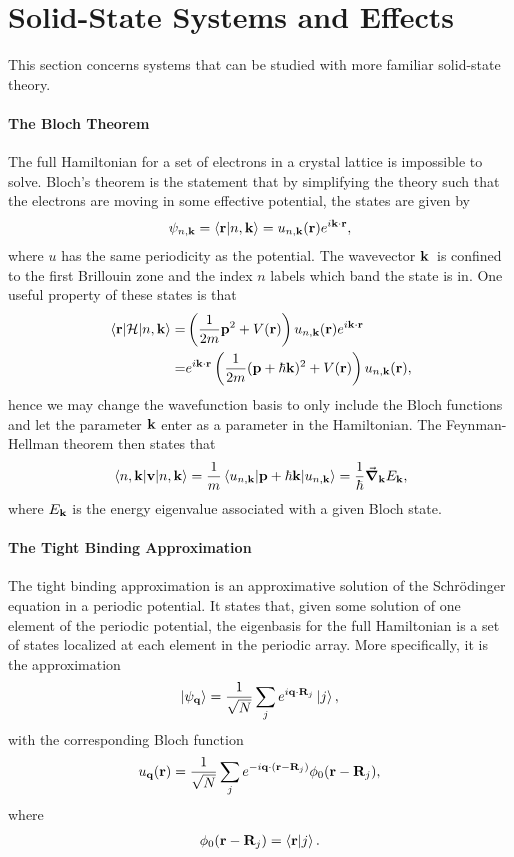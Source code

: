 \section{Solid-State Systems and Effects}
This section concerns systems that can be studied with more familiar solid-state theory.

\paragraph{The Bloch Theorem}
The full Hamiltonian for a set of electrons in a crystal lattice is impossible to solve. Bloch's theorem is the statement that by simplifying the theory such that the electrons are moving in some effective potential, the states are given by
\begin{align*}
	\psi_{n, \vb{k}} = \braket{\vb{r}}{n, \vb{k}} = u_{n, \vb{k}}(\vb{r})e^{i\vb{k}\cdot\vb{r}},
\end{align*}
where $u$ has the same periodicity as the potential. The wavevector $\vb{k}$ is confined to the first Brillouin zone and the index $n$ labels which band the state is in. One useful property of these states is that
\begin{align*}
	\mel{\vb{r}}{\ensuremath{\mathcal{H}}}{n, \vb{k}} =& \left(\frac{1}{2m}\vb{p}^{2} + V(\vb{r})\right)u_{n, \vb{k}}(\vb{r})e^{i\vb{k}\cdot\vb{r}} \\
	                              =& e^{i\vb{k}\cdot\vb{r}}\left(\frac{1}{2m}(\vb{p} + \hbar\vb{k})^{2} + V(\vb{r})\right)u_{n, \vb{k}}(\vb{r}),
\end{align*}
hence we may change the wavefunction basis to only include the Bloch functions and let the parameter $\vb{k}$ enter as a parameter in the Hamiltonian. The Feynman-Hellman theorem then states that
\begin{align*}
	\expval{\vb{v}}{n, \vb{k}} = \frac{1}{m}\expval{\vb{p} + \hbar\vb{k}}{u_{n, \vb{k}}} = \frac{1}{\hbar}\grad_{\vb{k}}E_{\vb{k}},
\end{align*}
where $E_{\vb{k}}$ is the energy eigenvalue associated with a given Bloch state.

\paragraph{The Tight Binding Approximation}
The tight binding approximation is an approximative solution of the Schrödinger equation in  a periodic potential. It states that, given some solution of one element of the periodic potential, the eigenbasis for the full Hamiltonian is a set of states localized at each element in the periodic array. More specifically, it is the approximation
\begin{align*}
	\ket{\psi_{\vb{q}}} = \frac{1}{\sqrt{N}}\sum\limits_{j}e^{i\vb{q}\cdot\vb{R}_{j}}\ket{j},
\end{align*}
with the corresponding Bloch function
\begin{align*}
	u_{\vb{q}}(\vb{r}) = \frac{1}{\sqrt{N}}\sum\limits_{j}e^{-i\vb{q}\cdot(\vb{r} - \vb{R}_{j})}\phi_{0}(\vb{r} - \vb{R}_{j}),
\end{align*}
where
\begin{align*}
	\phi_{0}(\vb{r} - \vb{R}_{j}) = \braket{\vb{r}}{j}.
\end{align*}

